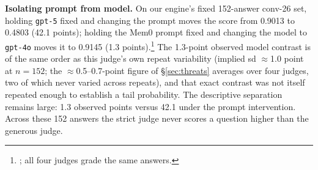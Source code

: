 \documentclass[11pt]{article}
\begin{document}
\textbf{Isolating prompt from model.} On our engine's fixed 152-answer conv-26 set, holding \texttt{gpt-5} fixed and changing the prompt moves the score from 0.9013 to 0.4803 (42.1 points); holding the Mem0 prompt fixed and changing the model to \texttt{gpt-4o} moves it to 0.9145 (1.3 points).\footnote{; all four judges grade the same answers.} The 1.3-point observed model contrast is of the same order as this judge's own repeat variability (implied sd $\approx$1.0 point at $n=152$; the $\approx$0.5--0.7-point figure of \S\ref{sec:threats} averages over four judges, two of which never varied across repeats), and that exact contrast was not itself repeated enough to establish a tail probability. The descriptive separation remains large: 1.3 observed points versus 42.1 under the prompt intervention. Across these 152 answers the strict judge never scores a question higher than the generous judge.
\end{document}
